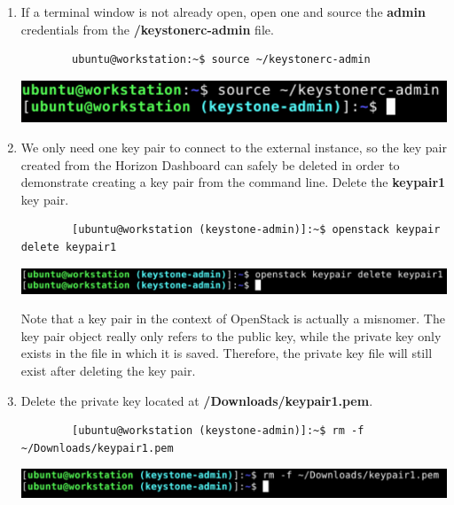\documentclass[letterpaper, 12pt]{article}
\begin{document}
\begin{enumerate}
    \item If a terminal window is not already open, open one and source the \textbf{admin} credentials from the \textbf{\texttildemid/keystonerc-admin} file.
    \begin{lstlisting}
        ubuntu@workstation:~$ source ~/keystonerc-admin
    \end{lstlisting}

    \begin{center}
        \includegraphics[width=\linewidth]{images/part4/step4.png}
    \end{center}

    \item We only need one key pair to connect to the external instance, so the key pair created from the Horizon Dashboard can safely be deleted in order to demonstrate creating a key pair from the command line.
    Delete the \textbf{keypair1} key pair.
    \begin{lstlisting}
        [ubuntu@workstation (keystone-admin)]:~$ openstack keypair delete keypair1
    \end{lstlisting}

    \begin{center}
        \includegraphics[width=\linewidth]{images/part4/step5.png}
    \end{center}

    \begin{notebox}
        Note that a key pair in the context of OpenStack is actually a misnomer.
        The key pair object really only refers to the public key, while the private key only exists in the file in which it is saved.
        Therefore, the private key file will still exist after deleting the key pair.
    \end{notebox}

    \item Delete the private key located at \textbf{\texttildemid/Downloads/keypair1.pem}.
    \begin{lstlisting}
        [ubuntu@workstation (keystone-admin)]:~$ rm -f ~/Downloads/keypair1.pem
    \end{lstlisting}

    \begin{center}
        \includegraphics[width=\linewidth]{images/part4/step6.png}
    \end{center}


\end{enumerate}
\end{document}

